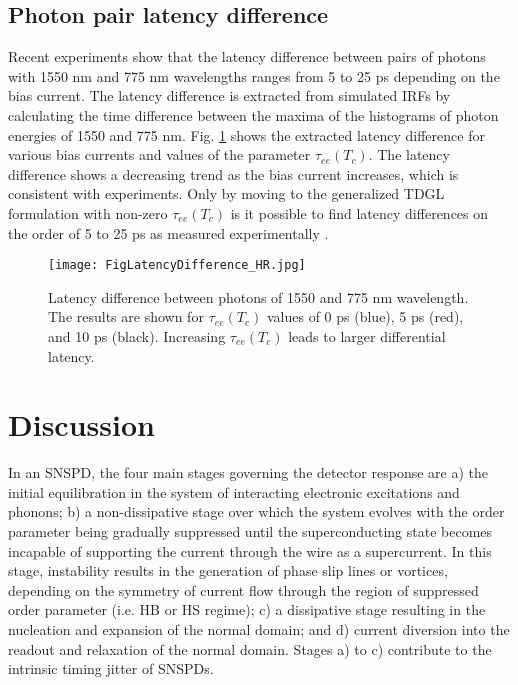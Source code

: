 \documentclass[%
reprint,
 amsmath,amssymb,
aps,
pra,
]{revtex4-1}
\begin{document}
\subsection{\label{sec:level2}Photon pair latency difference}
\quad Recent experiments \cite{korzh_demonstrating_2018} show that the latency difference between pairs of photons with 1550 nm and 775 nm wavelengths ranges from 5 to 25 ps depending on the bias current.  The latency difference is extracted from simulated IRFs by calculating the time difference between the maxima of the histograms of photon energies of 1550 and 775 nm.  Fig. \ref{F Latency Difference} shows the extracted latency difference for various bias currents and values of the parameter \(\tau_{ee}\left(T_c\right) \).  The latency difference shows a decreasing trend as the bias current increases, which is consistent with experiments.  Only by moving to the generalized TDGL formulation with non-zero \(\tau_{ee}\left(T_c\right) \) is it possible to find latency differences on the order of 5 to 25 ps as measured experimentally \cite{korzh_demonstrating_2018}.
\begin{figure}
\texttt{[image: FigLatencyDifference\_HR.jpg]}
\caption{Latency difference between photons of 1550 and 775 nm wavelength.  The results are shown for \(\tau_{ee}\left(T_c\right) \) values of 0 ps (blue), 5 ps (red), and 10 ps (black).  Increasing \(\tau_{ee}\left(T_c\right) \) leads to larger differential latency. 
}
\label{F Latency Difference}
\end{figure}

\section{\label{sec:Discussion}Discussion}
\quad In an SNSPD, the four main stages governing the detector response are a) the initial equilibration in the system of interacting electronic excitations and phonons; b) a non-dissipative stage over which the system evolves with the order parameter being gradually suppressed until the superconducting state becomes incapable of supporting the current through the wire as a supercurrent.  In this stage, instability results in the generation of phase slip lines or vortices, depending on the symmetry of current flow through the region of suppressed order parameter (i.e. HB or HS regime); c) a dissipative stage resulting in the nucleation and expansion of the normal domain; and d) current diversion into the readout and relaxation of the normal domain. Stages a) to c) contribute to the intrinsic timing jitter of SNSPDs. 
\end{document}

